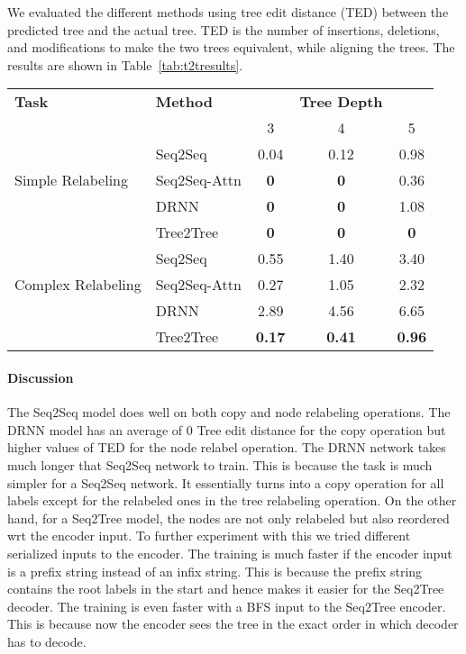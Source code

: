 \documentclass[11pt,a4paper]{article}
\begin{document}
We evaluated the different methods using tree edit distance (TED) \citep{tai1979tree,bille2005survey} between the predicted tree and the actual tree. TED is the number of insertions, deletions, and modifications to make the two trees equivalent, while aligning the trees.  
The results are shown in Table~\ref{tab:t2tresults}.
\begin{table*}[h!]
    \centering
    \begin{tabular}{l l|c c c }
         {\bf Task} & {\bf Method} &  & {\bf Tree Depth}  & \\ 
         & & 3 & 4 & 5  \\ \hline
         & Seq2Seq & 0.04& 0.12 & 0.98 \\
         Simple Relabeling & Seq2Seq-Attn & {\bf 0} & {\bf 0} & 0.36 \\
         & DRNN & {\bf 0} & {\bf 0} & 1.08 \\ 
         & Tree2Tree & {\bf 0} & {\bf 0} & {\bf 0} \\ \hline
         & Seq2Seq & 0.55 & 1.40 & 3.40 \\
         Complex Relabeling & Seq2Seq-Attn & 0.27 & 1.05 & 2.32 \\
          & DRNN & 2.89 & 4.56 & 6.65 \\  & Tree2Tree & {\bf 0.17} & {\bf 0.41} & {\bf 0.96} \\\hline
         
         
    \end{tabular}
    \caption{Tree edit distance for the tree tasks of tree copying (Copy),  node relabeling (Relabeling). The models are sequence-to-sequence
    (Seq2Seq), sequence-to-sequence with attention
    (Seq2Seq-Attn) and our DRNN Seq2Tree transducer method.}
    \label{tab:t2tresults}
\end{table*}
\paragraph{Discussion}
The Seq2Seq model does well on both copy and node relabeling operations. The DRNN model has an average of 0 Tree edit distance for the copy operation but higher values of TED for the node relabel operation.
The DRNN network takes much longer that Seq2Seq network to train. This is because the task is much simpler for a Seq2Seq network. It essentially turns into a copy operation for all labels except for the relabeled ones in the tree relabeling operation. On the other hand, for a Seq2Tree model, the nodes are not only relabeled but also reordered wrt the encoder input. To further experiment with this we tried different serialized inputs to the encoder. The training is much faster if the encoder input is a prefix string instead of an infix string. This is because the prefix string contains the root labels in the start and hence makes it easier for the Seq2Tree decoder. The training is even faster with a BFS input to the Seq2Tree encoder. This is because now the encoder sees the tree in the exact order in which decoder has to decode.
\end{document}
